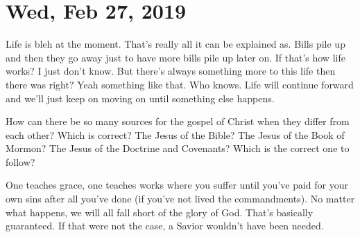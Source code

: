 \section{Wed, Feb 27, 2019}

Life is bleh at the moment. That's really all it can be explained as. Bills pile 
up and then they go away just to have more bills pile up later on. If that's how 
life works? I just don't know. But there's always something more to this life 
then there was right? Yeah something like that. Who knows. Life will continue 
forward and we'll just keep on moving on until something else happens.

How can there be so many sources for the gospel of Christ when they differ from 
each other? Which is correct? The Jesus of the Bible? The Jesus of the Book of 
Mormon? The Jesus of the Doctrine and Covenants? Which is the correct one to 
follow?

One teaches grace, one teaches works where you suffer until you've paid for your 
own sins after all you've done (if you've not lived the commandments). No matter 
what happens, we will all fall short of the glory of God. That's basically 
guaranteed. If that were not the case, a Savior wouldn't have been needed.
